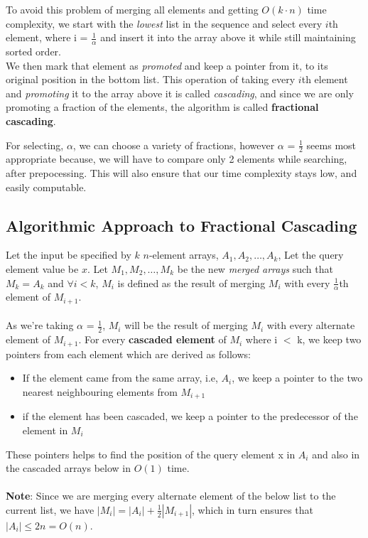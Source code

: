 \documentclass[11pt]{article}
\begin{document}
To avoid this problem of merging all elements and getting $O(k \cdot n)$ time complexity, we start with the \textit{lowest} list in the sequence and select every $i$th element, where i = $\frac{1}{\alpha}$ and insert it into the array above it while still maintaining sorted order. \\
We then mark that element as \textit{promoted} and keep a pointer from it, to its original position in the bottom list. This operation of taking every $i$th element and \textit{promoting} it to the array above it is called \textit{cascading}, and since we are only promoting a fraction of the elements, the algorithm is called \textbf{fractional cascading}.

For selecting, $\alpha$, we can choose a variety of fractions, however $\alpha$ = $\frac{1}{2}$ seems most appropriate because, we will have to compare only 2 elements while searching, after prepocessing. This will also ensure that our time complexity stays low, and easily computable.


\subsection{Algorithmic Approach to Fractional Cascading}

Let the input be specified by $k$ $n$-element arrays, $A_1,A_2,\dots,A_k$, Let the query element value be $x$.
Let $M_1,M_2,\dots,M_k$ be the new \textit{merged arrays} such that $M_k = A_k$ and $\forall i < k$, $M_i$ is defined as the result of merging $M_i$ with every $\frac{1}{\alpha}$th element of $M_{i+1}$. \\ \\
As we're taking $\alpha$ = $\frac{1}{2}$, $M_i$ will be the result of merging $M_i$ with every alternate element of $M_{i+1}$. For every \textbf{cascaded element} of $M_i$ where i $<$ k, we keep two pointers from each element which are derived as follows:
\begin{itemize}
    \item If the element came from the same array, i.e, $A_i$, we keep a pointer to the two nearest neighbouring elements from $M_{i+1}$
    \item if the element has been cascaded, we keep a pointer to the predecessor of the element in $M_i$
\end{itemize}
These pointers helps to find the position of the query element x in $A_i$ and also in the cascaded arrays below in $O(1)$ time. \\ \\
\textbf{Note}: Since we are merging every alternate element of the below list to the current list, we have 
$|M_i| = |A_i| +\frac{1}{2}|M_{i+1}|$, which in turn ensures that $|A_i| \leq 2n = O(n)$. \\
\end{document}
